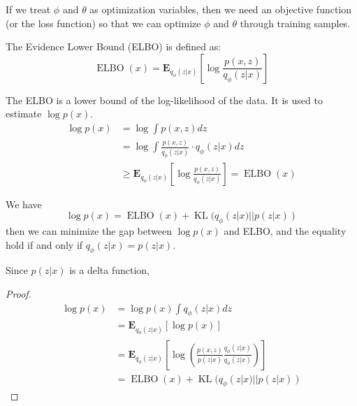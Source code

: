If we treat $\phi$ and $\theta$ as optimization variables, then we need an objective function (or the loss function) so that we can optimize $\phi$ and $\theta$ through training samples.
\begin{definition}
    The Evidence Lower Bound (ELBO) is defined as:
    \begin{equation}
        \operatorname{ELBO}(x) = \mathbf{E}_{q_\phi(z|x)}\left[\log \frac{p(x, z)}{q_\phi(z|x)}\right]
    \end{equation}
\end{definition}
\begin{remark}
    The ELBO is a lower bound of the log-likelihood of the data. It is used to estimate $\log p(x)$.
    \begin{equation}
        \begin{aligned}
            \log p(x) &= \log \int p(x, z) dz\\
            & = \log \int \frac{p(x, z)}{q_\phi(z|x)} \cdot q_\phi(z|x) dz\\
            & \geq \mathbf{E}_{q_\phi(z|x)}\left[\log \frac{p(x, z)}{q_\phi(z|x)}\right] = \operatorname{ELBO}(x)
        \end{aligned}
    \end{equation}
\end{remark}
\begin{theorem}
    We have 
    \begin{equation}
        \log p(x) =\operatorname{ELBO}(x) + \operatorname{KL}(q_\phi(z|x)||p(z|x))
    \end{equation}
    then we can minimize the gap between $\log p(x)$ and ELBO, and the equality hold if and only if $q_\phi(z|x)=p(z|x)$.

    Since $p(z|x)$ is a delta function, 
\end{theorem}
\begin{proof}
    \begin{equation}
        \begin{aligned}
            \log p(x) & = \log p(x)\int q_\phi(z|x)dz\\
            &=\mathbf{E}_{q_\phi(z|x)}\left[\log p(x)\right]\\
            & = \mathbf{E}_{q_\phi(z|x)}\left[\log \left(\frac{p(x, z)}{p(z|x)}\frac{q_\phi(z|x)}{q_\phi(z|x)}\right)\right]\\
            & =\operatorname{ELBO}(x) + \operatorname{KL}(q_\phi(z|x)||p(z|x))
        \end{aligned}
    \end{equation}
\end{proof}

